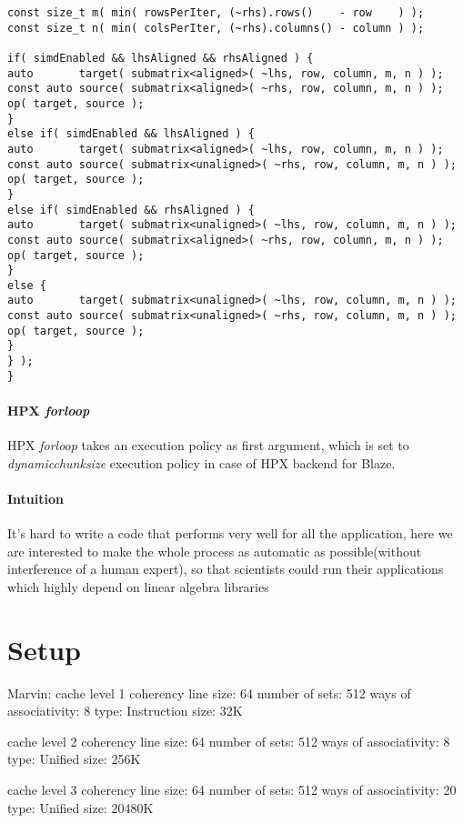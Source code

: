 \begin{lstlisting}[float,floatplacement=H,caption= {New implementation of Assign function for HPX backend in Blaze.}, label={newd_hpx_backend}]
const size_t m( min( rowsPerIter, (~rhs).rows()    - row    ) );
const size_t n( min( colsPerIter, (~rhs).columns() - column ) );

if( simdEnabled && lhsAligned && rhsAligned ) {
auto       target( submatrix<aligned>( ~lhs, row, column, m, n ) );
const auto source( submatrix<aligned>( ~rhs, row, column, m, n ) );
op( target, source );
}
else if( simdEnabled && lhsAligned ) {
auto       target( submatrix<aligned>( ~lhs, row, column, m, n ) );
const auto source( submatrix<unaligned>( ~rhs, row, column, m, n ) );
op( target, source );
}
else if( simdEnabled && rhsAligned ) {
auto       target( submatrix<unaligned>( ~lhs, row, column, m, n ) );
const auto source( submatrix<aligned>( ~rhs, row, column, m, n ) );
op( target, source );
}
else {
auto       target( submatrix<unaligned>( ~lhs, row, column, m, n ) );
const auto source( submatrix<unaligned>( ~rhs, row, column, m, n ) );
op( target, source );
}
} );
}
\end{lstlisting}

\paragraph{HPX \textit{for\textunderscore loop}}
HPX \textit{for\textunderscore loop} takes an execution policy as first argument, which is set to \textit{dynamic\textunderscore chunk\textunderscore size} execution policy in case of HPX backend for Blaze.



\paragraph{Intuition}
It's hard to write a code that performs very well for all the application, here we are interested to make the whole process as automatic as possible(without interference of a human expert), so that scientists could run their applications which highly depend on linear algebra libraries 

\section{Setup}
Marvin:
cache level 1
coherency line size: 64
number of sets: 512
ways of associativity: 8
type: Instruction
size: 32K

cache level 2
coherency line size: 64
number of sets: 512
ways of associativity: 8
type: Unified
size: 256K

cache level 3
coherency line size: 64
number of sets: 512
ways of associativity: 20
type: Unified
size: 20480K


